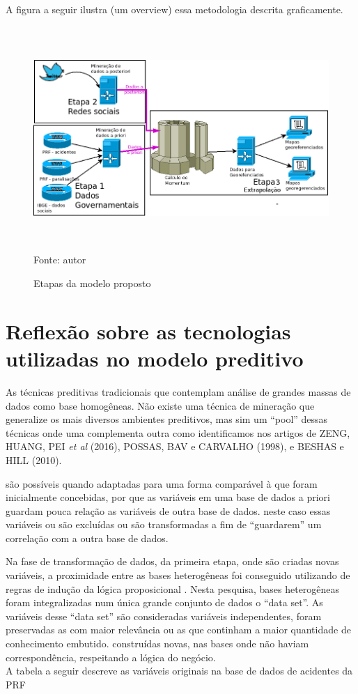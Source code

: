 A figura a seguir ilustra (um overview) essa metodologia descrita graficamente.

\pagebreak

\begin{figure}[ht]
\centering
\caption{Etapas da modelo proposto}
\includegraphics[width=170mm, height=85mm]{Figuras/Metodologia/metodologiaGeral.png}\\
\tiny Fonte: autor
\end{figure}

\section{Reflexão sobre as tecnologias utilizadas no modelo preditivo}\label{result}

As técnicas preditivas tradicionais que contemplam análise de grandes massas de dados como base homogêneas.
Não existe uma técnica de mineração que generalize os mais diversos ambientes preditivos, mas sim um ``pool'' 
dessas técnicas onde uma complementa outra como identificamos nos artigos de ZENG, HUANG, PEI \textit{et al} (2016), 
POSSAS, BAV e CARVALHO (1998), e BESHAS e HILL (2010).



são possíveis quando adaptadas para uma forma comparável à que
foram inicialmente concebidas, por que as variáveis em uma base de dados a priori guardam pouca relação as variáveis de outra base de dados.
neste caso essas variáveis ou são excluídas ou são transformadas a fim de ``guardarem'' um correlação com a outra base de dados. 

Na fase de transformação de dados, da primeira etapa, onde são criadas novas variáveis, a proximidade entre as
bases heterogêneas foi conseguido utilizando de regras de indução da lógica proposicional \cite{NorvigRussel2004}.
Nesta pesquisa, bases heterogêneas foram integralizadas num única grande conjunto de dados o ``data set''. As variáveis desse ``data set''
são consideradas variáveis independentes, foram preservadas as com maior relevância ou as que continham a maior quantidade de conhecimento
embutido.  construídas novas, nas bases onde não haviam correspondência, respeitando a lógica do negócio.\\
A tabela a seguir descreve as variáveis originais na base de dados de acidentes da PRF 

